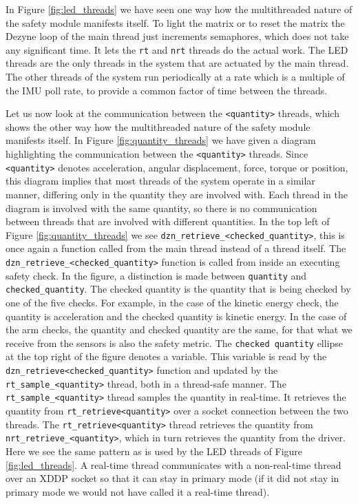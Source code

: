 \documentclass[12pt]{scrreprt}
\begin{document}
In Figure \ref{fig:led_threads} we have seen one way how the multithreaded nature of the safety module manifests itself. To light the matrix or to reset the matrix the Dezyne loop of the main thread just increments semaphores, which does not take any significant time. It lets the \texttt{rt} and \texttt{nrt} threads do the actual work. The LED threads are the only threads in the system that are actuated by the main thread. The other threads of the system run periodically at a rate which is a multiple of the IMU poll rate, to provide a common factor of time between the threads.
\par
Let us now look at the communication between the \texttt{<quantity>} threads, which shows the other way how the multithreaded nature of the safety module manifests itself. In Figure \ref{fig:quantity_threads} we have given a diagram highlighting the communication between the \texttt{<quantity>} threads. Since \texttt{<quantity>} denotes acceleration, angular displacement, force, torque or position, this diagram implies that most threads of the system operate in a similar manner, differing only in the quantity they are involved with. Each thread in the diagram is involved with the same quantity, so there is no communication between threads that are involved with different quantities. In the top left of Figure \ref{fig:quantity_threads} we see \texttt{dzn\_retrieve\_<checked\_quantity>}, this is once again a function called from the main thread instead of a thread itself. The \texttt{dzn\_retrieve\_<checked\_quantity>} function is called from inside an executing safety check. In the figure, a distinction is made between \texttt{quantity} and \texttt{checked\_quantity}. The checked quantity is the quantity that is being checked by one of the five checks. For example, in the case of the kinetic energy check, the quantity is acceleration and the checked quantity is kinetic energy. In the case of the arm checks, the quantity and checked quantity are the same, for that what we receive from the sensors is also the safety metric. The \texttt{checked quantity} ellipse at the top right of the figure denotes a variable. This variable is read by the \texttt{dzn\_retrieve<checked\_quantity>} function and updated by the \texttt{rt\_sample\_<quantity>} thread, both in a thread-safe manner. The \texttt{rt\_sample\_<quantity>} thread samples the quantity in real-time. It retrieves the quantity from \texttt{rt\_retrieve<quantity>} over a socket connection between the two threads. The \texttt{rt\_retrieve<quantity>} thread retrieves the quantity from \texttt{nrt\_retrieve\_<quantity>}, which in turn retrieves the quantity from the driver. Here we see the same pattern as is used by the LED threads of Figure \ref{fig:led_threads}. A real-time thread communicates with a non-real-time thread over an XDDP socket so that it can stay in primary mode (if it did not stay in primary mode we would not have called it a real-time thread).
\end{document}
